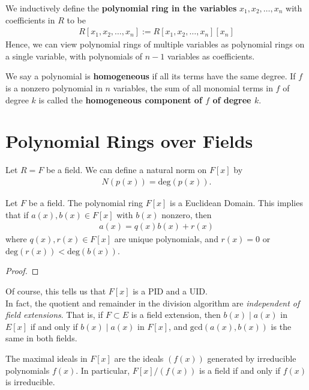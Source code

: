 \documentclass{memoir}
\begin{document}
\begin{defn}
	We inductively define the \textbf{polynomial ring in the variables} \(x_1,x_2,\ldots,x_n\) with coefficients in \(R\) to be
	\begin{align*}
		R[x_1,x_2,\ldots,x_n] := R[x_1,x_2,\ldots,x_n][x_n]
	\end{align*}
	Hence, we can view polynomial rings of multiple variables as polynomial rings on a single variable, with polynomials of \(n-1\) variables as coefficients.
\end{defn}
We say a polynomial is \textbf{homogeneous} if all its terms have the same degree. If \(f\) is a nonzero polynomial in \(n\) variables, the sum of all monomial terms in \(f\) of degree \(k\) is called the \textbf{homogeneous component of \(f\) of degree \(k\)}.

\section{Polynomial Rings over Fields}
\label{sec:polynomial_rings_over_fields}

Let \(R = F\) be a field. We can define a natural norm on \(F[x]\) by
\begin{align*}
	N(p(x)) = \textrm{deg}(p(x)).
\end{align*}
\begin{thm}
	Let \(F\) be a field. The polynomial ring \(F[x]\) is a Euclidean Domain. This implies that if \(a(x),b(x) \in F[x]\) with \(b(x)\) nonzero, then
	\begin{align*}
		a(x) = q(x)b(x) + r(x)
	\end{align*}
	where \(q(x),r(x) \in F[x]\) are unique polynomials, and \(r(x) = 0\) or \(\textrm{deg}(r(x)) < \textrm{deg}(b(x))\).
\end{thm}

\begin{proof}
	
\end{proof}
Of course, this tells us that \(F[x]\) is a PID and a UID.\\

In fact, the quotient and remainder in the division algorithm are \textit{independent of field extensions}. That is, if \(F\subset E\) is a field extension, then \(b(x)\mid a(x)\) in \(E[x]\) if and only if \(b(x)\mid a(x)\) in \(F[x]\), and \(\textrm{gcd}(a(x),b(x))\) is the same in both fields.

\begin{prop}
	The maximal ideals in \(F[x]\) are the ideals \((f(x))\) generated by irreducible polynomials \(f(x)\). In particular, \(F[x] / (f(x))\) is a field if and only if \(f(x)\) is irreducible.
\end{prop}
\end{document}
